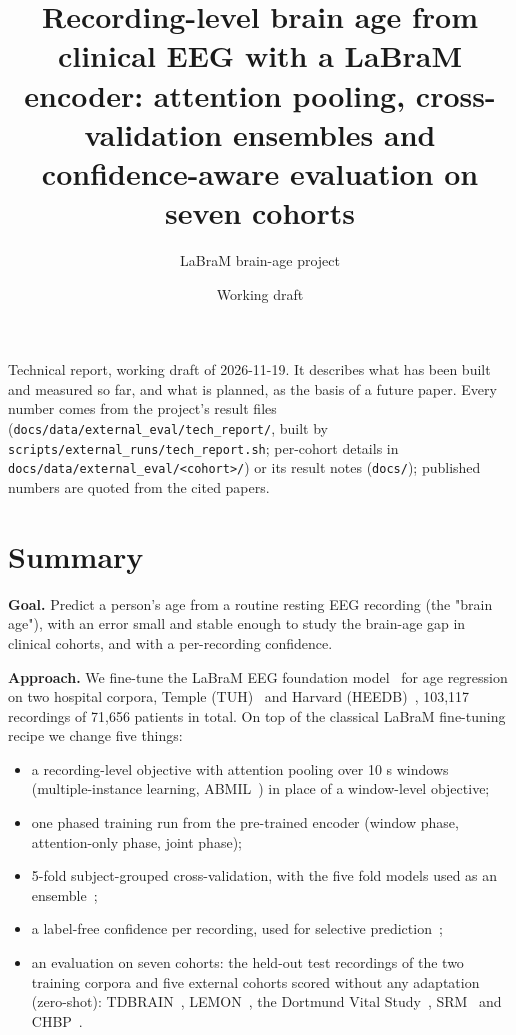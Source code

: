\documentclass[11pt,a4paper]{article}
\title{Recording-level brain age from clinical EEG with a LaBraM encoder: attention pooling, cross-validation ensembles and confidence-aware evaluation on seven cohorts}
\author{LaBraM brain-age project}
\date{Working draft}
\begin{document}
\maketitle


Technical report, working draft of 2026-11-19. It describes what has been built and measured so far, and what is planned, as the basis of a future paper. Every number comes from the project's result files (\texttt{docs/data/external\_eval/tech\_report/}, built by \texttt{scripts/external\_runs/tech\_report.sh}; per-cohort details in \texttt{docs/data/external\_eval/<cohort>/}) or its result notes (\texttt{docs/}); published numbers are quoted from the cited papers.

\section{Summary}

\textbf{Goal.} Predict a person's age from a routine resting EEG recording (the "brain age"), with an error small and stable enough to study the brain-age gap in clinical cohorts, and with a per-recording confidence.

\textbf{Approach.} We fine-tune the LaBraM EEG foundation model~\citep{jiang2024labram} for age regression on two hospital corpora, Temple (TUH)~\citep{obeid2016tuh} and Harvard (HEEDB)~\citep{heedb}, 103,117 recordings of 71,656 patients in total. On top of the classical LaBraM fine-tuning recipe we change five things:

\begin{itemize}
\item a recording-level objective with attention pooling over 10 s windows (multiple-instance learning, ABMIL~\citep{ilse2018abmil}) in place of a window-level objective;
\item one phased training run from the pre-trained encoder (window phase, attention-only phase, joint phase);
\item 5-fold subject-grouped cross-validation, with the five fold models used as an ensemble~\citep{lakshminarayanan2017ensembles};
\item a label-free confidence per recording, used for selective prediction~\citep{geifman2017selective};
\item an evaluation on seven cohorts: the held-out test recordings of the two training corpora and five external cohorts scored without any adaptation (zero-shot): TDBRAIN~\citep{vandijk2022tdbrain}, LEMON~\citep{babayan2019lemon}, the Dortmund Vital Study~\citep{wascher2025dortmund}, SRM~\citep{hatlestadhall2021srm} and CHBP~\citep{valdessosa2021chbp}.
\end{itemize}
\end{document}
